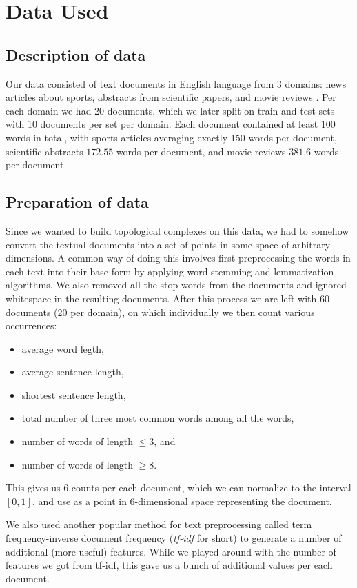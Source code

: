 \section{Data Used}
\label{sec:data_used}

\subsection{Description of data}
\label{sub:description_of_data}

Our data consisted of text documents in English language from 3 domains: news
articles about sports, abstracts from scientific papers, and movie reviews
. Per each domain we had 20 documents, which we later
split on train and test sets with 10 documents per set per domain. Each
document contained at least 100 words in total, with sports articles averaging
exactly 150 words per document, scientific abstracts $172.55$ words per
document, and movie reviews $381.6$ words per document.

\subsection{Preparation of data}
\label{sub:preparation_of_data}

Since we wanted to build topological complexes on this data, we had to somehow
convert the textual documents into a set of points in some space of arbitrary
dimensions. A common way of doing this involves first preprocessing the words
in each text into their base form by applying word stemming and lemmatization
algorithms. We also removed all the stop words from the documents and ignored
whitespace in the resulting documents. After this process we are left with 60
documents (20 per domain), on which individually we then count various
occurrences:

\begin{itemize}
  \item average word legth,
  \item average sentence length,
  \item shortest sentence length,
  \item total number of three most common words among all the words,
  \item number of words of length $\le 3$, and
  \item number of words of length $\ge 8$.
\end{itemize}

This gives us 6 counts per each document, which we can normalize to the
interval $[0, 1]$, and use as a point in $6$-dimensional space representing
the document.

We also used another popular method for text preprocessing called term
frequency-inverse document frequency (\textit{tf-idf} for short) to generate a number
of additional (more useful) features. 
While we played around with the number of features we got from tf-idf, this
gave us a bunch of additional values per each document.
